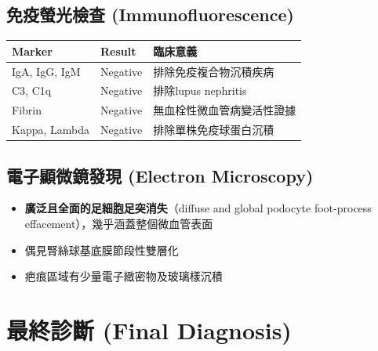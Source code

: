 \documentclass[12pt,a4paper]{article}
\begin{document}
\subsection{免疫螢光檢查 (Immunofluorescence)}

\begin{longtable}{>{\raggedright\arraybackslash}p{4cm} >{\raggedright\arraybackslash}p{4cm} >{\raggedright\arraybackslash}p{7cm}}
\toprule
\textbf{Marker} & \textbf{Result} & \textbf{臨床意義} \\
\midrule
\endfirsthead
\bottomrule
\endlastfoot

IgA, IgG, IgM & Negative & 排除免疫複合物沉積疾病 \\
\midrule
C3, C1q & Negative & 排除lupus nephritis \\
\midrule
Fibrin & Negative & 無血栓性微血管病變活性證據 \\
\midrule
Kappa, Lambda & Negative & 排除單株免疫球蛋白沉積 \\

\end{longtable}

\subsection{電子顯微鏡發現 (Electron Microscopy)}

\begin{itemize}[leftmargin=*]
    \item \textbf{廣泛且全面的足細胞足突消失}（diffuse and global podocyte foot-process effacement），幾乎涵蓋整個微血管表面
    \item 偶見腎絲球基底膜節段性雙層化
    \item 疤痕區域有少量電子緻密物及玻璃樣沉積
\end{itemize}


\section{最終診斷 (Final Diagnosis)}

\begin{center}
\end{center}
\end{document}
